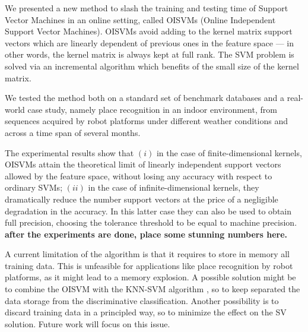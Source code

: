 We presented a new method to slash the training and testing time of
Support Vector Machines in an online setting, called OISVMs (Online
Independent Support Vector Machines). OISVMs avoid adding to the
kernel matrix support vectors which are linearly dependent of previous
ones in the feature space --- in other words, the kernel matrix is
always kept at full rank. The SVM problem is solved via an incremental
algorithm which benefits of the small size of the kernel matrix.

We tested the method both on a standard set of benchmark databases and
a real-world case study, namely place recognition in an indoor
environment, from sequences acquired by robot platforms under
different weather conditions and across a time span of several months.

The experimental results show that $(i)$ in the case of
finite-dimensional kernels, OISVMs attain the theoretical limit of
linearly independent support vectors allowed by the feature space,
without losing any accuracy with respect to ordinary SVMs; $(ii)$ in
the case of infinite-dimensional kernels, they dramatically reduce the
number support vectors at the price of a negligible degradation in the
accuracy. In this latter case they can also be used to obtain full
precision, choosing the tolerance threshold to be equal to machine
precision.
{\bf after the experiments are done, place some stunning numbers here.}

A current limitation of the algorithm is that it requires to store in
memory all training data. This is unfeasible for applications like
place recognition by robot platforms, as it might lead to a memory
explosion. A possible solution might be to combine the OISVM with the
KNN-SVM algorithm \cite{zhang:cvpr06}, so to keep separated the data
storage from the discriminative classification. Another possibility is
to discard training data in a principled way, so to minimize the
effect on the SV solution. Future work will focus on this issue.
